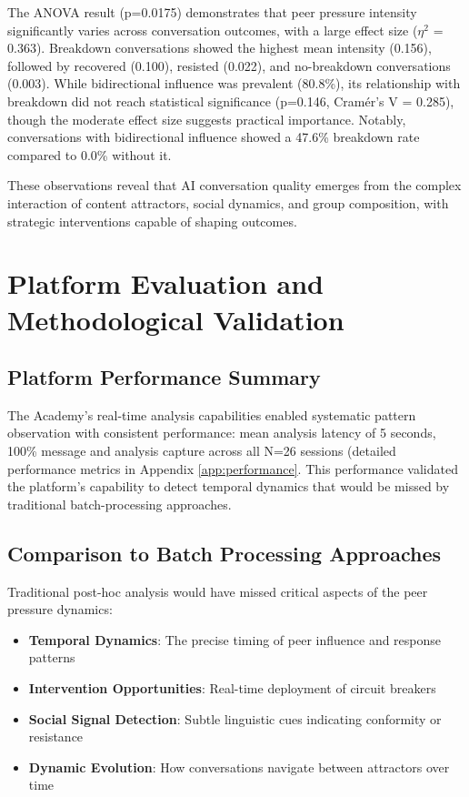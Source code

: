 \documentclass[11pt,letterpaper]{article}
\newcommand{\theacademy}{The Academy}
\newcommand{\exponedataTotalSessionsRaw}{26}
\newcommand{\exponedataTotalSessions}{N=\exponedataTotalSessionsRaw}
\newcommand{\exponedataBidirectionalPercentage}{80.8\%}
\newcommand{\exponedataBidirectionalPValue}{p=0.146}
\newcommand{\exponedataBidirectionalBreakdownRate}{47.6\%}
\newcommand{\exponedataNonBidirectionalBreakdownRate}{0.0\%}
\newcommand{\exponedataPeerPressureANOVAPValue}{p=0.0175}
\newcommand{\platformLatency}{5}
\begin{document}
The ANOVA result (\exponedataPeerPressureANOVAPValue{}) demonstrates that peer pressure intensity significantly varies across conversation outcomes, with a large effect size ($\eta^2$ = 0.363). Breakdown conversations showed the highest mean intensity (0.156), followed by recovered (0.100), resisted (0.022), and no-breakdown conversations (0.003). While bidirectional influence was prevalent (\exponedataBidirectionalPercentage{}), its relationship with breakdown did not reach statistical significance (\exponedataBidirectionalPValue{}, Cramér's V = 0.285), though the moderate effect size suggests practical importance. Notably, conversations with bidirectional influence showed a \exponedataBidirectionalBreakdownRate{} breakdown rate compared to \exponedataNonBidirectionalBreakdownRate{} without it.

These observations reveal that AI conversation quality emerges from the complex interaction of content attractors, social dynamics, and group composition, with strategic interventions capable of shaping outcomes.

\section{Platform Evaluation and Methodological Validation}

\subsection{Platform Performance Summary}

\theacademy{}'s real-time analysis capabilities enabled systematic pattern observation with consistent performance: mean analysis latency of \platformLatency{} seconds, 100\% message and analysis capture across all \exponedataTotalSessions{} sessions (detailed performance metrics in Appendix \ref{app:performance}. This performance validated the platform's capability to detect temporal dynamics that would be missed by traditional batch-processing approaches.

\subsection{Comparison to Batch Processing Approaches}

Traditional post-hoc analysis would have missed critical aspects of the peer pressure dynamics:

\begin{itemize}
    \item \textbf{Temporal Dynamics}: The precise timing of peer influence and response patterns
    \item \textbf{Intervention Opportunities}: Real-time deployment of circuit breakers
    \item \textbf{Social Signal Detection}: Subtle linguistic cues indicating conformity or resistance
    \item \textbf{Dynamic Evolution}: How conversations navigate between attractors over time
\end{itemize}
\end{document}
